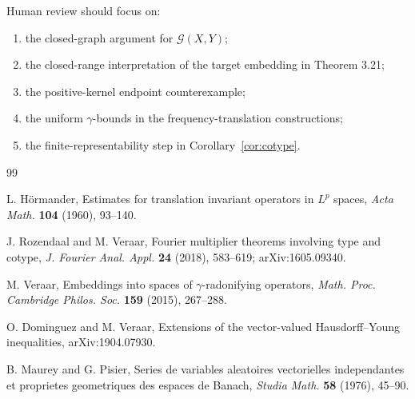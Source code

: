 \documentclass[11pt]{article}
\newcommand{\Gcal}{\mathcal G}
\newcommand{\gam}{\gamma}
\begin{document}
Human review should focus on:
\begin{enumerate}[label=\textup{(\roman*)}]
\item the closed-graph argument for \(\Gcal(X,Y)\);
\item the closed-range interpretation of the target embedding in Theorem 3.21;
\item the positive-kernel endpoint counterexample;
\item the uniform \(\gam\)-bounds in the frequency-translation constructions;
\item the finite-representability step in Corollary~\ref{cor:cotype}.
\end{enumerate}

\begin{thebibliography}{99}

L. H\"ormander,
\newblock Estimates for translation invariant operators in \(L^p\) spaces,
\newblock \emph{Acta Math.} \textbf{104} (1960), 93--140.

J. Rozendaal and M. Veraar,
\newblock Fourier multiplier theorems involving type and cotype,
\newblock \emph{J. Fourier Anal. Appl.} \textbf{24} (2018), 583--619;
arXiv:1605.09340.

M. Veraar,
\newblock Embeddings into spaces of \(\gamma\)-radonifying operators,
\newblock \emph{Math. Proc. Cambridge Philos. Soc.} \textbf{159} (2015),
267--288.

O. Dominguez and M. Veraar,
\newblock Extensions of the vector-valued Hausdorff--Young inequalities,
\newblock arXiv:1904.07930.

B. Maurey and G. Pisier,
\newblock Series de variables aleatoires vectorielles independantes et
proprietes geometriques des espaces de Banach,
\newblock \emph{Studia Math.} \textbf{58} (1976), 45--90.

\end{thebibliography}
\end{document}
